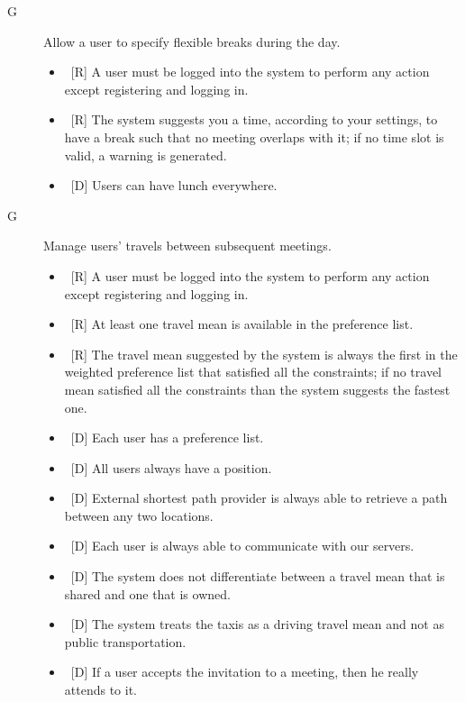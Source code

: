 \begin{description}
\item[G\thecountReq] Allow a user to specify flexible breaks during the day.

\begin{itemize}
\item~[R] A user must be logged into the system to perform any action except registering and logging in.
\item~[R] The system suggests you a time, according to your settings, to have a break such that no meeting overlaps with it; if no time slot is valid, a warning is generated.
\end{itemize}

\begin{itemize}
\item~[D] Users can have lunch everywhere.
\end{itemize}

\item[G\thecountReq] Manage users’ travels between subsequent meetings.

\begin{itemize}
\item~[R] A user must be logged into the system to perform any action except registering and logging in.
\item~[R] At least one travel mean is available in the preference list.
\item~[R] The travel mean suggested by the system is always the first in the weighted preference list that satisfied all the constraints; if no travel mean satisfied all the constraints than the system suggests the fastest one.
\end{itemize}

\begin{itemize}
\item~[D] Each user has a preference list.
\item~[D] All users always have a position.
\item~[D] External shortest path provider is always able to retrieve a path between any two locations.
\item~[D] Each user is always able to communicate with our servers.
\item~[D] The system does not differentiate between a travel mean that is shared and one that is owned.
\item~[D] The system treats the taxis as a driving travel mean and not as public transportation.
\item~[D] If a user accepts the invitation to a meeting, then he really attends to it.
\end{itemize}
\end{description}
